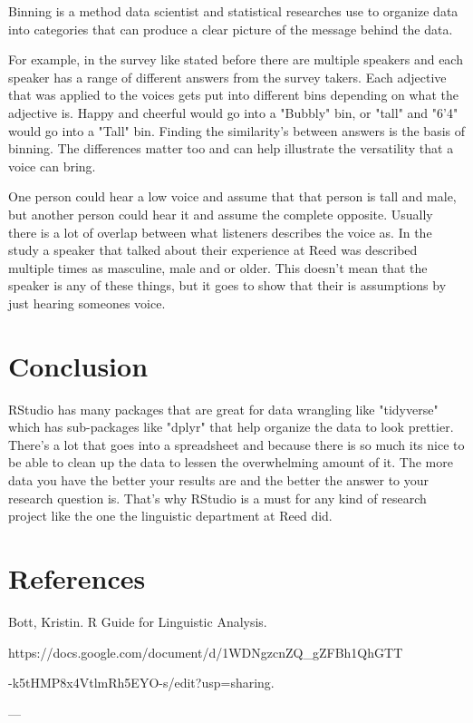\documentclass{scrartcl}
\begin{document}
Binning is a method data scientist and statistical researches use to organize data into categories that can produce a clear picture of the message behind the data. 

For example, in the survey like stated before there are multiple speakers and each speaker has a range of different answers from the survey takers. Each adjective that was applied to the voices gets put into different bins depending on what the adjective is. Happy and cheerful would go into a "Bubbly" bin, or "tall" and "6'4" would go into a "Tall" bin. Finding the similarity's between answers is the basis of binning. The differences matter too and can help illustrate the versatility that a voice can bring. 

One person could hear a low voice and assume that that person is tall and male, but another person could hear it and assume the complete opposite. Usually there is a lot of overlap between what listeners describes the voice as. In the study a speaker that talked about their experience at Reed was described multiple times as masculine, male and or older. This doesn't mean that the speaker is any of these things, but it goes to show that their is assumptions by just hearing someones voice. 

\section{Conclusion}
RStudio has many packages that are great for data wrangling like "tidyverse" which has sub-packages like "dplyr" that help organize the data to look prettier. There's a lot that goes into a spreadsheet and because there is so much its nice to be able to clean up the data to lessen the overwhelming amount of it. The more data you have the better your results are and the better the answer to your research question is. That's why RStudio is a must for any kind of research project like the one the linguistic department at Reed did. 


\newpage
\section{References}
\SMALL Bott, Kristin. R Guide for Linguistic Analysis. \par 
https://docs.google.com/document/d/1WDNgzcnZQ_gZFBh1QhGTT \par
-k5tHMP8x4VtlmRh5EYO-s/edit?usp=sharing. \par

---
\end{document}
